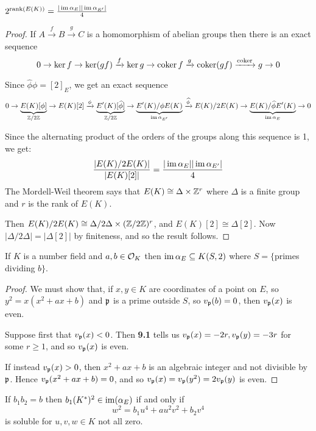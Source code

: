 \documentclass[10pt,a4paper]{article}
\begin{document}
\begin{lemma}
  $2^{\text{rank}(E(K))} = \frac{|\operatorname{im} \alpha_E||\operatorname{im} \alpha_{E'}|}{4}$
\end{lemma}
\begin{proof}
  If $A\xrightarrow{f}B\xrightarrow{g}C$ is a homomorphism of abelian groups then there is an exact sequence
  \[0 \to \ker f \to \ker (gf) \xrightarrow{f} \ker g \to \operatorname{coker} f \xrightarrow{g} \operatorname{coker} (gf) \xrightarrow {\operatorname{coker}} g \to 0\]

  Since $\hat{\phi}\phi = [2]_E$, we get an exact sequence
  \[0 \to \underbrace{E(K)[\phi]}_{\mathbb{Z}/2\mathbb{Z}} \to E(K)[2] \xrightarrow{\phi} \underbrace{E'(K)[\widehat{\phi}]}_{\mathbb{Z}/2\mathbb{Z}} \to \underbrace{E'(K)/\phi E(K)}_{\operatorname{im} \alpha_{E'}} \xrightarrow{\widehat{\phi}} E(K)/2E(K) \to \underbrace{E(K)/\widehat{\phi} E'(K)}_{\operatorname{im} \alpha_E} \to 0\]

  Since the alternating product of the orders of the groups along this sequence is 1, we get:
  \[\frac{|E(K)/2E(K)|}{|E(K)[2]|} = \frac{|\operatorname{im} \alpha_E||\operatorname{im} \alpha_{E'}|}{4}\]
  The Mordell-Weil theorem says that $E(K) \cong \Delta \times \mathbb{Z}^r$ where $\Delta$ is a finite group and $r$ is the rank of $E(K)$.

  Then $E(K)/2E(K) \cong \Delta/2\Delta \times (\mathbb{Z}/2\mathbb{Z})^r$, and $E(K)[2] \cong \Delta[2]$. Now $|\Delta/2\Delta| = |\Delta[2]|$ by finiteness, and so the result follows.
\end{proof}
\begin{lemma}
  If $K$ is a number field and $a, b \in \mathcal{O}_K$ then $\operatorname{im} \alpha_E \subseteq K(S,2)$ where $S = \{$primes dividing $b\}$.
\end{lemma}
\begin{proof}
  We must show that, if $x, y \in K$ are coordinates of a point on $E$, so $y^2=x(x^2+ax+b)$ and $\mathfrak{p}$ is a prime outside $S$, so $v_{\mathfrak{p}}(b) = 0$, then $v_{\mathfrak{p}}(x)$ is even.

  Suppose first that $v_{\mathfrak{p}}(x) < 0$. Then \textbf{9.1} tells us $v_{\mathfrak{p}}(x) = -2r, v_{\mathfrak{p}}(y) = -3r$ for some $r \geq 1$, and so $v_{\mathfrak{p}}(x)$ is even.

  If instead $v_{\mathfrak{p}}(x) > 0$, then $x^2+ax+b$ is an algebraic integer and not divisible by $\mathfrak{p}$. Hence $v_{\mathfrak{p}}(x^2+ax+b) = 0$, and so $v_{\mathfrak{p}}(x) = v_{\mathfrak{p}}(y^2) = 2v_{\mathfrak{p}}(y)$ is even.
\end{proof}
\begin{lemma}
  If $b_1 b_2 = b$ then $b_1(K^\ast)^2 \in \operatorname{im}(\alpha_E)$ if and only if \[w^2 = b_1u^4+au^2v^2+b_2v^4\tag{$\ast$}\] is soluble for $u,v,w \in K$ not all zero.
\end{lemma}
\end{document}
